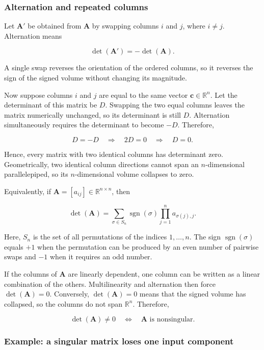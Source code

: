\documentclass[
  australian,
  12pt,
  letterpaper,
  DIV=11,
  numbers=noendperiod,
  twoside]{scrreprt}
\begin{document}
\subsubsection{Alternation and repeated
columns}\label{alternation-and-repeated-columns}

Let \(\mathbf A'\) be obtained from \(\mathbf A\) by swapping columns
\(i\) and \(j\), where \(i\neq j\). Alternation means

\[
\det(\mathbf A')=-\det(\mathbf A).
\]

A single swap reverses the orientation of the ordered columns, so it
reverses the sign of the signed volume without changing its magnitude.

Now suppose columns \(i\) and \(j\) are equal to the same vector
\(\mathbf c\in\mathbb R^n\). Let the determinant of this matrix be
\(D\). Swapping the two equal columns leaves the matrix numerically
unchanged, so its determinant is still \(D\). Alternation simultaneously
requires the determinant to become \(-D\). Therefore,

\[
D=-D
\quad\Longrightarrow\quad
2D=0
\quad\Longrightarrow\quad
D=0.
\]

Hence, every matrix with two identical columns has determinant zero.
Geometrically, two identical column directions cannot span an
\(n\)-dimensional parallelepiped, so its \(n\)-dimensional volume
collapses to zero.

Equivalently, if \(\mathbf A=[a_{ij}]\in\mathbb R^{n\times n}\), then

\[
\det(\mathbf A)
=
\sum_{\sigma\in S_n}
\operatorname{sgn}(\sigma)
\prod_{j=1}^{n}a_{\sigma(j),j}.
\]

Here, \(S_n\) is the set of all permutations of the indices
\(1,\ldots,n\). The sign \(\operatorname{sgn}(\sigma)\) equals \(+1\)
when the permutation can be produced by an even number of pairwise swaps
and \(-1\) when it requires an odd number.

If the columns of \(\mathbf A\) are linearly dependent, one column can
be written as a linear combination of the others. Multilinearity and
alternation then force \(\det(\mathbf A)=0\). Conversely,
\(\det(\mathbf A)=0\) means that the signed volume has collapsed, so the
columns do not span \(\mathbb R^n\). Therefore,

\[
\boxed{
\det(\mathbf A)\neq0
\quad\Longleftrightarrow\quad
\mathbf A\text{ is nonsingular}
}.
\]

\subsubsection{Example: a singular matrix loses one input
component}\label{example-a-singular-matrix-loses-one-input-component}
\end{document}
